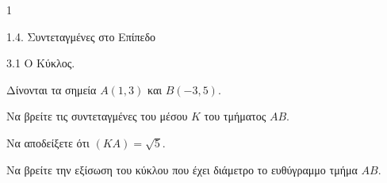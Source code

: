 \begin{ylh}{1}
    \item 1.4. Συντεταγμένες στο Επίπεδο
    \item 3.1 Ο Κύκλος.
\end{ylh}
Δίνονται τα σημεία $A(1,3)$ και $B(-3,5)$.
\begin{alist}
\item Να βρείτε τις συντεταγμένες του μέσου $K$ του τμήματος $AB$. 
\item Να αποδείξετε ότι $(KA)=\sqrt{5}$. 
\item Να βρείτε την εξίσωση του κύκλου που έχει διάμετρο το ευθύγραμμο τμήμα $AB$. 
\end{alist}